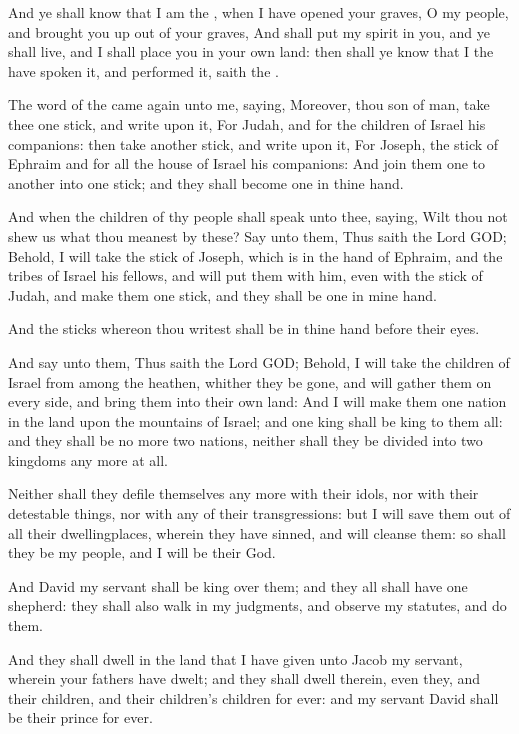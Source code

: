 \verse And ye shall know that I am the \LORD, when I have opened your graves, O my people, and brought you up out of your graves, \verse And shall put my spirit in you, and ye shall live, and I shall place you in your own land: then shall ye know that I the \LORD have spoken it, and performed it, saith the \LORD.

\verse The word of the \LORD came again unto me, saying, \verse Moreover, thou son of man, take thee one stick, and write upon it, For Judah, and for the children of Israel his companions: then take another stick, and write upon it, For Joseph, the stick of Ephraim and for all the house of Israel his companions: \verse And join them one to another into one stick; and they shall become one in thine hand.

\verse And when the children of thy people shall speak unto thee, saying, Wilt thou not shew us what thou meanest by these?  \verse Say unto them, Thus saith the Lord GOD; Behold, I will take the stick of Joseph, which is in the hand of Ephraim, and the tribes of Israel his fellows, and will put them with him, even with the stick of Judah, and make them one stick, and they shall be one in mine hand.

\verse And the sticks whereon thou writest shall be in thine hand before their eyes.

\verse And say unto them, Thus saith the Lord GOD; Behold, I will take the children of Israel from among the heathen, whither they be gone, and will gather them on every side, and bring them into their own land: \verse And I will make them one nation in the land upon the mountains of Israel; and one king shall be king to them all: and they shall be no more two nations, neither shall they be divided into two kingdoms any more at all.

\verse Neither shall they defile themselves any more with their idols, nor with their detestable things, nor with any of their transgressions: but I will save them out of all their dwellingplaces, wherein they have sinned, and will cleanse them: so shall they be my people, and I will be their God.

\verse And David my servant shall be king over them; and they all shall have one shepherd: they shall also walk in my judgments, and observe my statutes, and do them.

\verse And they shall dwell in the land that I have given unto Jacob my servant, wherein your fathers have dwelt; and they shall dwell therein, even they, and their children, and their children's children for ever: and my servant David shall be their prince for ever.

